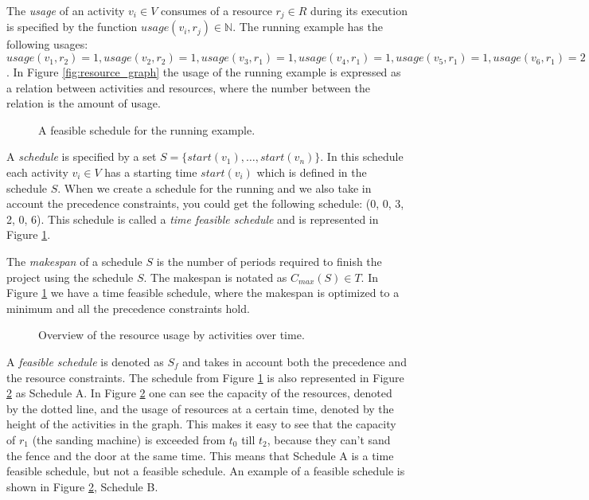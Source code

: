\documentclass{article}
\theoremstyle{definition}
\newcommand{\inputtikz}[1]{}
\newcommand{\res}[0]{\ensuremath{R}} %
\newcommand{\usage}[2]{\ensuremath{usage(v_{#1}, r_{#2})}} %
\newcommand{\start}[1]{\ensuremath{start(v_{#1})}} %
\newcommand{\makespan}[1]{\ensuremath{C_{max}(#1)}} %
\begin{document}
The \emph{usage} of an activity $v_i \in V$ consumes of a resource $r_j \in \res$ during its execution is specified by the function $\usage{i}{j} \in \mathbb{N}$.
The running example has the following usages: $\usage{1}{2} = 1, \usage{2}{2} = 1, \usage{3}{1} = 1, \usage{4}{1} = 1, \usage{5}{1} = 1, \usage{6}{1} = 2$.
In Figure \ref{fig:resource_graph} the usage of the running example is expressed as a relation between activities and resources, where the number between the relation is the amount of usage.

\begin{figure}[h]
	\centering
	\inputtikz{schedule_feasible}
	\caption{A feasible schedule for the running example. }
	\label{fig:time_feasible_schedule}
\end{figure}

A \emph{schedule} is specified by a set $S = \{\start{1}, \ldots, \start{n}\}$.
In this schedule each activity $v_i \in V$ has a starting time $\start{i}$ which is defined in the schedule $S$.
When we create a schedule for the running and we also take in account the precedence constraints, you could get the following schedule:
(0, 0, 3, 2, 0, 6). 
This schedule is called a \emph{time feasible schedule} and is represented in Figure \ref{fig:time_feasible_schedule}. 

The \emph{makespan} of a schedule $S$ is the number of periods required to finish the project using the schedule $S$. The makespan is notated as $\makespan{S} \in T$.
In Figure \ref{fig:time_feasible_schedule} we have a time feasible schedule, where the makespan is optimized to a minimum and all the precedence constraints hold.

\begin{figure}[h]
	\centering
	\inputtikz{schedule_feasible_profile}
	\caption{Overview of the resource usage by activities over time. }
	\label{fig:feasible_schedule}
\end{figure}

A \emph{feasible schedule} is denoted as $S_f$ and takes in account both the precedence and the resource constraints.
The schedule from Figure \ref{fig:time_feasible_schedule} is also represented in Figure \ref{fig:feasible_schedule} as Schedule A.
In Figure \ref{fig:feasible_schedule} one can see the capacity of the resources, denoted by the dotted line, and the usage of resources at a certain time, denoted by the height of the activities in the graph.
This makes it easy to see that the capacity of $r_1$ (the sanding machine) is exceeded from $t_0$ till $t_2$, because they can't sand the fence and the door at the same time.
This means that Schedule A is a time feasible schedule, but not a feasible schedule.
An example of a feasible schedule is shown in Figure \ref{fig:feasible_schedule}, Schedule B.
\end{document}
